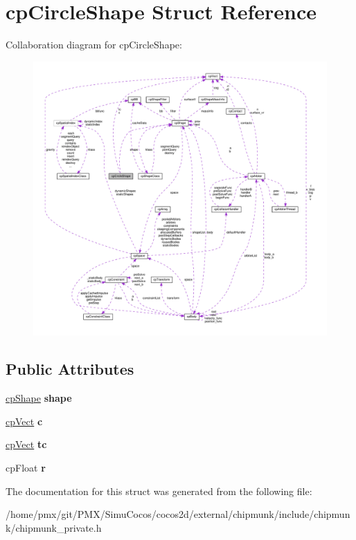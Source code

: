 \hypertarget{structcpCircleShape}{}\section{cp\+Circle\+Shape Struct Reference}
\label{structcpCircleShape}


Collaboration diagram for cp\+Circle\+Shape\+:
\nopagebreak
\begin{figure}[H]
\begin{center}
\leavevmode
\includegraphics[width=350pt]{structcpCircleShape__coll__graph}
\end{center}
\end{figure}
\subsection*{Public Attributes}
\begin{DoxyCompactItemize}
\item 
\mbox{\label{structcpCircleShape_a36cd91d5e626457fee162f22aa6c3acc}} 
\hyperlink{structcpShape}{cp\+Shape} {\bfseries shape}
\item 
\mbox{\label{structcpCircleShape_a7e8afd3b3517b245e32e52ec34591820}} 
\hyperlink{structcpVect}{cp\+Vect} {\bfseries c}
\item 
\mbox{\label{structcpCircleShape_acff09931d945f2af021449c232f51f35}} 
\hyperlink{structcpVect}{cp\+Vect} {\bfseries tc}
\item 
\mbox{\label{structcpCircleShape_a54e5d26ce462ecc786ac5ab411ebcebd}} 
cp\+Float {\bfseries r}
\end{DoxyCompactItemize}


The documentation for this struct was generated from the following file\+:\begin{DoxyCompactItemize}
\item 
/home/pmx/git/\+P\+M\+X/\+Simu\+Cocos/cocos2d/external/chipmunk/include/chipmunk/chipmunk\+\_\+private.\+h\end{DoxyCompactItemize}
